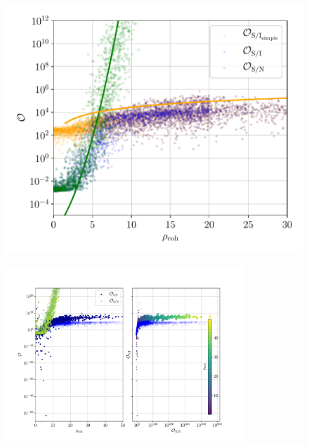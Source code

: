 \begin{figure}[!phtb]
\begin{center}
\includegraphics[width=1\columnwidth]{./figures/codeeval/stats/snr_vs_odds/snr_v_odds_plot}
\caption{ \protect}
\end{center}
\end{figure}


\begin{figure}[phtb]
\begin{center}
\includegraphics[width=0.8\textwidth]{./figures/codeeval/stats/snr_vs_odds_larger/snr_v_odds_larger_plot}
\caption{ \protect}
\end{center}
\end{figure}

